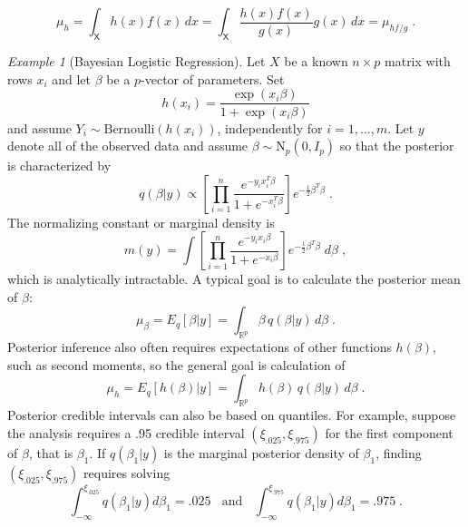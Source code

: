 \documentclass[12pt]{article}
\theoremstyle{plain}
\theoremstyle{definition}
\theoremstyle{remark}
\newtheorem{example}{Example}[section]
\newcommand{\sX}{\mathsf{X}}
\newcommand{\real}{\mathbb{R}}
\begin{document}
\[
\mu_{h} = \int_{\sX} h(x) f(x) \, dx = \int_{\sX} \frac{h(x)
  f(x)}{g(x)} g(x) \, dx = \mu_{hf/g} \; .
\]

\begin{example}[Bayesian Logistic Regression]
  Let $X$ be a known $n \times p$ matrix with rows $x_{i}$ and let
  $\beta$ be a $p$-vector of parameters. Set
\[
h(x_{i}) = \frac{\exp(x_{i} \beta)}{1+\exp(x_{i} \beta)}
\]
and assume $Y_{i} \sim \text{Bernoulli}(h(x_{i}))$, independently for
$i=1, \ldots, m$. Let $y$ denote all of the observed data and assume
$\beta \sim \text{N}_{p}(0, I_{p})$ so that the posterior is
characterized by
\[
q(\beta |y) \propto \left[ \prod_{i=1}^{n} \frac{e^{-y_i x_i^T
      \beta}}{1+ e^{- x_i^T \beta}}\right] e^{- \frac{1}{2} \beta^T
  \beta} \; .
\]
The normalizing constant or marginal density is
\[
m(y) = \int \left[ \prod_{i=1}^{n} \frac{e^{-y_i x_i
      \beta}}{1+ e^{- x_i \beta}}\right] e^{- \frac{1}{2} \beta^T
  \beta} \; d\beta \; ,
\]
which is analytically intractable. A typical goal is to calculate the
posterior mean of $\beta$:
\[
\mu_{\beta} = E_q [\beta | y] = \int_{\real^p} \beta \,q(\beta|y)\,
d\beta \; .
\]
Posterior inference also often requires expectations of other
functions $h(\beta)$, such as second moments, so the general goal is
calculation of
\[
\mu_{h} =  E_q [h(\beta) | y] = \int_{\real^p} h(\beta) \,q(\beta|y)\,
d\beta \; .
\]
Posterior credible intervals can also be based on quantiles.  For
example, suppose the analysis requires a .95 credible interval $(\xi_{.025},
\xi_{.975})$ for the first component of $\beta$, that is $\beta_1$. If
$q(\beta_{1} | y)$ is the marginal posterior density of $\beta_{1}$,
finding $(\xi_{.025}, \xi_{.975})$ requires solving
$$
\int_{-\infty}^{\xi_{.025}} q(\beta_{1} | y) d \beta_{1} = .025 ~~~~
\text{and} ~~~~
\int_{-\infty}^{\xi_{.975}} q(\beta_{1} | y) d \beta_{1} = .975 \; .
$$
\end{example}
\end{document}
